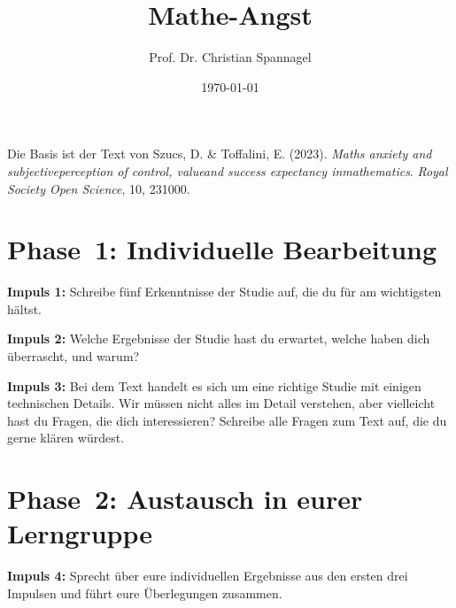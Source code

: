 \documentclass{../cssheet}
\title{Mathe-Angst}
\author{Prof. Dr. Christian Spannagel}
\date{\today}
\begin{document}
\printtitle

Die Basis ist der Text von Szucs, D. \& Toffalini, E. (2023). \emph{Maths anxiety and subjectiveperception of control, valueand success expectancy inmathematics}. \emph{Royal Society Open Science}, 10, 231000.

\section*{Phase~1: Individuelle Bearbeitung}

\textbf{Impuls 1:} Schreibe fünf Erkenntnisse der Studie auf, die du für am wichtigsten hältst.

\textbf{Impuls 2:} Welche Ergebnisse der Studie hast du erwartet, welche haben dich überrascht, und warum?

\textbf{Impuls 3:} Bei dem Text handelt es sich um eine richtige Studie mit einigen technischen Details. Wir müssen nicht alles im Detail verstehen, aber vielleicht hast du Fragen, die dich interessieren? Schreibe alle Fragen zum Text auf, die du gerne klären würdest.

\section*{Phase~2: Austausch in eurer Lerngruppe}

\textbf{Impuls 4:} Sprecht über eure individuellen Ergebnisse aus den ersten drei Impulsen und führt eure Überlegungen zusammen.

\vspace*{10mm}
\printlicense

\printsocials
\end{document}
